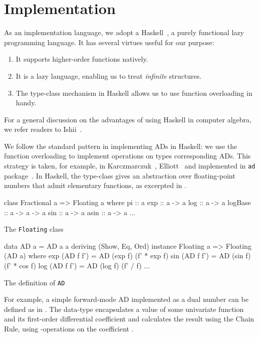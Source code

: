 \documentclass[./rims-smooth-paper.tex]{subfiles}
\begin{document}
\section{Implementation}
\label{sec:impl}
As an implementation language, we adopt a Haskell~\cite{haskell.org:2021tt}, a purely functional lazy programming language.
It has several virtues useful for our purpose:
\begin{enumerate}
\item It supports higher-order functions natively.
\item It is a lazy language, enabling us to treat \emph{infinite} structures.
\item The type-class mechanism in Haskell allows us to use function overloading in handy.
\end{enumerate}
For a general discussion on the advantages of using Haskell in computer algebra, we refer readers to Ishii~\cite{ISHII:2018ek}.

We follow the standard pattern in implementing ADs in Haskell: we use the function overloading to implement operations on types corresponding ADs.
This strategy is taken, for example, in Karczmarczuk~\cite{Karczmarczuk:2001ww}, Elliott~\cite{Elliott2009-beautiful-differentiation} and implemented in \texttt{ad} package~\cite{Kmett:2010aa}.
In Haskell, the  type-class gives an abstraction over floating-point numbers that admit elementary functions, as excerpted in .
\begin{listing}[tbp]
\begin{code}
class Fractional a => Floating a where
  pi :: a
  exp :: a -> a
  log :: a -> a
  logBase :: a -> a -> a
  sin :: a -> a
  asin :: a -> a
  ...
\end{code}
\caption{The \texttt{Floating} class\label{lst:cls-floating}}
\end{listing}
\begin{listing}[tbp]
\begin{code}
  data AD a = AD a a deriving (Show, Eq, Ord)
  instance Floating a => Floating (AD a) where
    exp (AD f f') = AD (exp f) (f' * exp f)
    sin (AD f f') = AD (sin f) (f' * cos f)
    log (AD f f') = AD (log f) (f' / f)
    ...
\end{code}
\caption{The definition of \texttt{AD}\label{lst:def-AD}}
\end{listing}

For example, a simple forward-mode AD implemented as a dual number can be defined as in .
The data-type  encapsulates a value of some univariate function and its first-order differential coefficient and calculates the result using the Chain Rule, using -operations on the coefficient .
\end{document}
